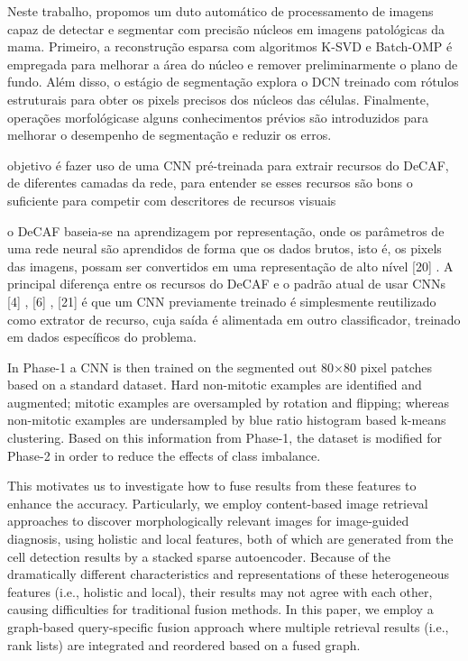 \documentclass[preprint,12pt,authoryear]{elsarticle}
\begin{document}
\cite{PAN2017} Neste trabalho, propomos um duto automático de processamento de imagens capaz de detectar e segmentar com precisão núcleos em imagens patológicas da mama. Primeiro, a reconstrução esparsa com algoritmos K-SVD e Batch-OMP é empregada para melhorar a área do núcleo e remover preliminarmente o plano de fundo. Além disso, o estágio de segmentação explora o DCN treinado com rótulos estruturais para obter os pixels precisos dos núcleos das células. Finalmente, operações morfológicase alguns conhecimentos prévios são introduzidos para melhorar o desempenho de segmentação e reduzir os erros.

\cite{SPANHOL2017} objetivo é fazer uso de uma CNN pré-treinada para extrair recursos do DeCAF, de diferentes camadas da rede, para entender se esses recursos são bons o suficiente para competir com descritores de recursos visuais 

o DeCAF baseia-se na aprendizagem por representação, onde os parâmetros de uma rede neural são aprendidos de forma que os dados brutos, isto é, os pixels das imagens, possam ser convertidos em uma representação de alto nível [20] . A principal diferença entre os recursos do DeCAF e o padrão atual de usar CNNs [4] , [6] , [21] é que um CNN previamente treinado é simplesmente reutilizado como extrator de recurso, cuja saída é alimentada em outro classificador, treinado em dados específicos do problema.

\cite{WAHAB2017} In Phase-1 a CNN is then trained on the segmented out 80×80 pixel patches based on a standard dataset. Hard non-mitotic examples are identified and augmented; mitotic examples are oversampled by rotation and flipping; whereas non-mitotic examples are undersampled by blue ratio histogram based k-means clustering. Based on this information from Phase-1, the dataset is modified for Phase-2 in order to reduce the effects of class imbalance.

\cite{ZHANG2016} This motivates us to investigate how to fuse results from these features to enhance the accuracy. Particularly, we employ content-based image retrieval approaches to discover morphologically relevant images for image-guided diagnosis, using holistic and local features, both of which are generated from the cell detection results by a stacked sparse autoencoder. Because of the dramatically different characteristics and representations of these heterogeneous features (i.e., holistic and local), their results may not agree with each other, causing difficulties for traditional fusion methods. In this paper, we employ a graph-based query-specific fusion approach where multiple retrieval results (i.e., rank lists) are integrated and reordered based on a fused graph.
\end{document}
